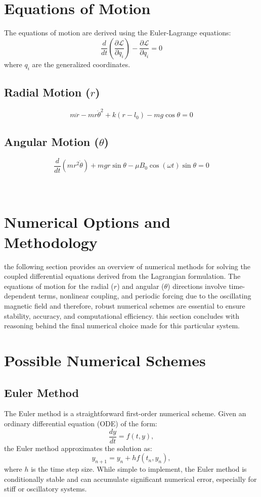 \documentclass[12pt]{article}
\begin{document}
\section{Equations of Motion}
The equations of motion are derived using the Euler-Lagrange equations:
\[
\frac{d}{dt}\left(\frac{\partial \mathcal{L}}{\partial \dot{q}_i}\right) - \frac{\partial \mathcal{L}}{\partial q_i} = 0
\]
where \( q_i \) are the generalized coordinates.

\subsection{Radial Motion (\( r \))}
\[
m\ddot{r} - mr\dot{\theta}^2 + k(r - l_0) - mg\cos\theta = 0
\]

\subsection{Angular Motion (\( \theta \))}
\[
\frac{d}{dt}\left(mr^2\dot{\theta}\right) + mgr\sin\theta - \mu B_0\cos(\omega t)\sin\theta = 0
\]
\\\\
\section{Numerical Options and Methodology}
the following section provides an overview of numerical methods for solving the coupled differential equations derived from the Lagrangian formulation. The equations of motion for the radial (\( r \)) and angular (\( \theta \)) directions involve time-dependent terms, nonlinear coupling, and periodic forcing due to the oscillating magnetic field and therefore, robust numerical schemes are essential to ensure stability, accuracy, and computational efficiency. this section concludes with reasoning behind the final numerical choice made for this particular system.

\section{Possible Numerical Schemes}

\subsection{Euler Method}
The Euler method is a straightforward first-order numerical scheme. Given an ordinary differential equation (ODE) of the form:
\[
\frac{dy}{dt} = f(t, y),
\]
the Euler method approximates the solution as:
\[
y_{n+1} = y_n + h f(t_n, y_n),
\]
where \( h \) is the time step size. While simple to implement, the Euler method is conditionally stable and can accumulate significant numerical error, especially for stiff or oscillatory systems.
\end{document}
